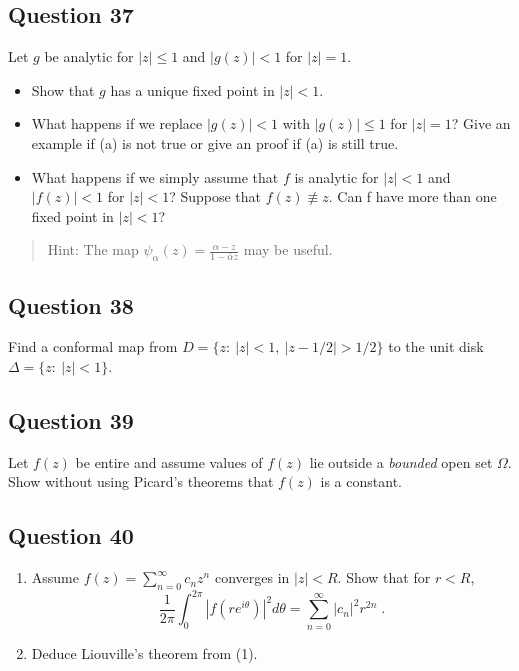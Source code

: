 \documentclass[12pt]{article}
\begin{document}
\hypertarget{question-37-2}{%
\subsection{Question 37}\label{question-37-2}}

Let \(g\) be analytic for \(|z|\leq 1\) and \(|g(z)| < 1\) for
\(|z| = 1\).

\begin{itemize}
\item
  Show that \(g\) has a unique fixed point in \(|z| < 1\).
\item
  What happens if we replace \(|g(z)| < 1\) with \(|g(z)|\leq 1\) for
  \(|z|=1\)? Give an example if (a) is not true or give an proof if (a)
  is still true.
\item
  What happens if we simply assume that \(f\) is analytic for
  \(|z| < 1\) and \(|f(z)| < 1\) for \(|z| < 1\)? Suppose that
  \(f(z) \not\equiv z\). Can f have more than one fixed point in
  \(|z| < 1\)?
\end{itemize}

\begin{quote}
Hint: The map
\(\displaystyle{\psi_{\alpha}(z)=\frac{\alpha-z}{1-\bar{\alpha}z}}\) may
be useful.
\end{quote}

\hypertarget{question-38-2}{%
\subsection{Question 38}\label{question-38-2}}

Find a conformal map from \(D = \{z :\  |z| < 1,\ |z - 1/2| > 1/2\}\) to
the unit disk \(\Delta=\{z: \ |z|<1\}\).

\hypertarget{question-39-2}{%
\subsection{Question 39}\label{question-39-2}}

Let \(f(z)\) be entire and assume values of \(f(z)\) lie outside a
\emph{bounded} open set \(\Omega\). Show without using Picard's theorems
that \(f(z)\) is a constant.

\hypertarget{question-40-2}{%
\subsection{Question 40}\label{question-40-2}}

\begin{enumerate}
\def\labelenumi{(\arabic{enumi})}
\item
  Assume \(\displaystyle f(z) = \sum_{n=0}^\infty c_n z^n\) converges in
  \(|z| < R\). Show that for \(r <R\),
  \[\frac{1}{2 \pi} \int_0^{2 \pi} |f(r e^{i \theta})|^2 d \theta
  = \sum_{n=0}^\infty |c_n|^2 r^{2n} \; .\]
\item
  Deduce Liouville's theorem from (1).
\end{enumerate}
\end{document}
